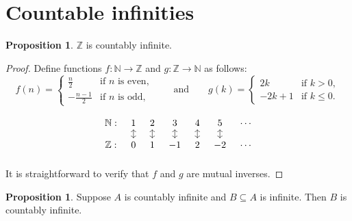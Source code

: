 \documentclass[12pt]{article}
\theoremstyle{definition}
\newtheorem{proposition}[definition]{Proposition}
\begin{document}
\section{Countable infinities}
\label{sec:countable_infinities}

\begin{proposition}
\label{prop:Z_is_countable}
    \( \mathbb{Z} \) is countably infinite.
\end{proposition}

\begin{proof}
    Define functions \( f : \mathbb{N} \to \mathbb{Z} \) and \( g : \mathbb{Z} \to \mathbb{N} \) as follows:
    \[
    f(n) = \begin{cases}
        \frac{n}{2} & \text{if } n \text{ is even}, \\
        -\frac{n-1}{2} & \text{if } n \text{ is odd},
    \end{cases}
    \qquad \text{and} \qquad
    g(k) = \begin{cases}
        2k & \text{if } k > 0, \\
        -2k + 1 & \text{if } k \leq 0.
    \end{cases}
    \]

    \[
    \begin{tikzcd}[column sep = tiny, row sep = small]
        \mathbb{N} : & 1 \arrow[d, leftrightarrow] & 2 \arrow[d, leftrightarrow] & 3 \arrow[d, leftrightarrow] & 4 \arrow[d, leftrightarrow] & 5 \arrow[d, leftrightarrow] & \cdots \\
        \mathbb{Z} : & 0 & 1 & -1 & 2 & -2 & \cdots \\
    \end{tikzcd}
    \]
    It is straightforward to verify that \( f \) and \( g \) are mutual inverses.
\end{proof}

\begin{proposition}
\label{prop:infinite_subset_of_countable_set_is_countable}
    Suppose \( A \) is countably infinite and \( B \subseteq A \) is infinite. Then \( B \) is countably infinite.
\end{proposition}
\end{document}

